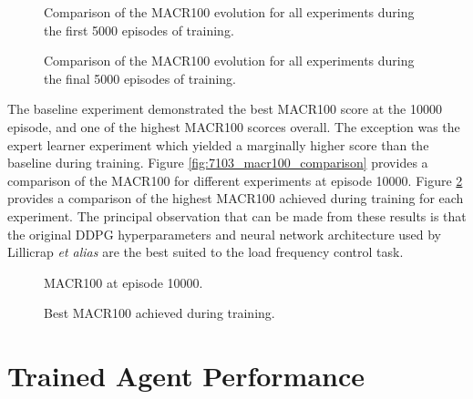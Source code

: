 \begin{figure}[h]
	\centering
	
	
	\caption{Comparison of the MACR100 evolution for all experiments during the first 5000 episodes of training.}\label{fig:7101_MACR100_first}
	
	\vspace{0.5cm}
	
	
	\caption{Comparison of the MACR100 evolution for all experiments during the final 5000 episodes of training.}\label{fig:7102_MACR100_second}
\end{figure}

\clearpage

The baseline experiment demonstrated the best MACR100 score at the 10000 episode, and one of the highest MACR100 scorces overall. The exception was the expert learner experiment which yielded a marginally higher score than the baseline during training. Figure \ref{fig:7103_macr100_comparison} provides a comparison of the MACR100 for different experiments at episode 10000. Figure \ref{fig:7104_macr100_comparison} provides a comparison of the highest MACR100 achieved during training for each experiment. The principal observation that can be made from these results is that the original DDPG hyperparameters and neural network architecture used by Lillicrap \textit{et alias} are the best suited to the load frequency control task.

\begin{figure}[h]
	\begin{minipage}{0.50\textwidth}
		\centering
		\resizebox{7cm}{!}{}
		\caption{MACR100 at episode 10000.}\label{fig:7103_macr100_comparison}
	\end{minipage}
	\hspace{0.25cm}
	\begin{minipage}{0.50\textwidth}
		\resizebox{7cm}{!}{}
		\caption{Best MACR100 achieved during training.}\label{fig:7104_macr100_comparison}
	\end{minipage}
\end{figure}
 
\section{Trained Agent Performance}

